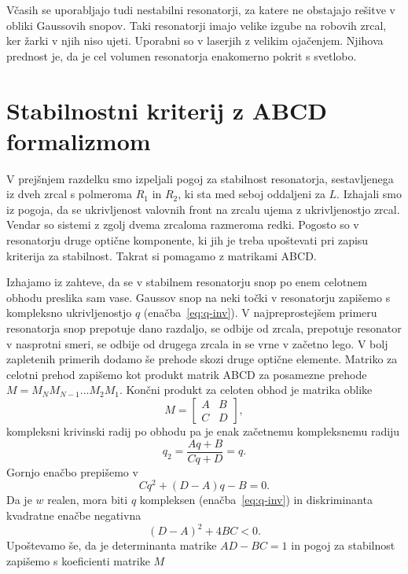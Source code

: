 \begin{remark}
Včasih se uporabljajo tudi nestabilni resonatorji, za 
katere ne obstajajo rešitve v obliki Gaussovih snopov. Taki resonatorji 
imajo velike izgube na robovih zrcal, ker žarki v njih niso ujeti. 
Uporabni so v laserjih z velikim ojačenjem. Njihova prednost je, da je cel
volumen resonatorja enakomerno pokrit s svetlobo.
\end{remark}

\section{Stabilnostni kriterij z ABCD formalizmom}
V prejšnjem razdelku smo izpeljali pogoj za stabilnost resonatorja, 
sestavljenega iz dveh zrcal s polmeroma $R_1$ in $R_2$, ki sta med 
seboj oddaljeni za $L$. Izhajali smo iz pogoja, da se ukrivljenost
valovnih front na zrcalu ujema z ukrivljenostjo zrcal. Vendar so sistemi z
zgolj dvema zrcaloma razmeroma redki. Pogosto so v resonatorju
druge optične komponente, ki jih je treba upoštevati pri zapisu
kriterija za stabilnost. Takrat si pomagamo z matrikami ABCD. 

Izhajamo iz zahteve, da se v stabilnem resonatorju snop po enem celotnem obhodu
preslika sam vase. Gaussov snop na neki točki v resonatorju 
zapišemo s kompleksno ukrivljenostjo $q$ (enačba~\ref{eq:q-inv}).
V najpreprostejšem primeru resonatorja snop prepotuje dano razdaljo, se odbije od zrcala, prepotuje
resonator v nasprotni smeri, se odbije od drugega zrcala in se vrne v začetno lego. V bolj 
zapletenih primerih dodamo še prehode skozi druge optične elemente. Matriko 
za celotni prehod zapišemo kot produkt matrik ABCD za posamezne prehode $M = M_N M_{N-1} ...M_2 M_1$.
Končni produkt za celoten obhod je matrika oblike
\begin{equation}
M = \left[\begin{array}{cc}
A & B\\
C & D
\end{array}\right],
\end{equation}
kompleksni krivinski radij po obhodu pa je enak začetnemu kompleksnemu radiju
\begin{equation}
q_2 = \frac{Aq+B}{Cq+D} = q.
\end{equation}
Gornjo enačbo prepišemo v 
\begin{equation}
Cq^2+(D-A)q-B=0.
\end{equation}
Da je $w$ realen, mora biti $q$ kompleksen (enačba~\ref{eq:q-inv}) 
in diskriminanta kvadratne enačbe negativna
\begin{equation}
(D-A)^2+ 4BC<0.
\end{equation}
Upoštevamo še, da je determinanta matrike $AD-BC=1$ in pogoj za 
stabilnost zapišemo s koeficienti matrike $M$

